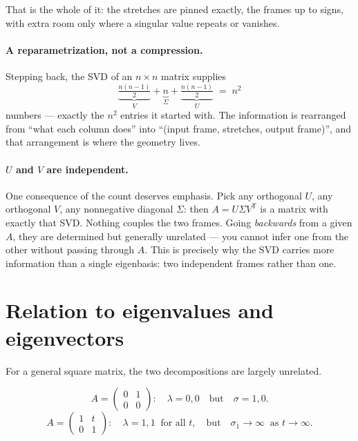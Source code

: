 \documentclass[11pt]{article}
\numberwithin{equation}{section}
\newcommand{\T}{^{\mathsf{T}}}
\theoremstyle{plainish}
\begin{document}
\noindent
That is the whole of it: the stretches are pinned exactly, the frames up to
signs, with extra room only where a singular value repeats or vanishes.

\paragraph{A reparametrization, not a compression.} Stepping back, the SVD of an
$n \times n$ matrix supplies
\begin{equation}\underbrace{\tfrac{n(n-1)}{2}}_{V} + \underbrace{n}_{\Sigma} + \underbrace{\tfrac{n(n-1)}{2}}_{U} \;=\; n^2
\end{equation}
numbers --- exactly the $n^2$ entries it started with. The information is
rearranged from ``what each column does'' into ``(input frame, stretches, output
frame)'', and that arrangement is where the geometry lives.

\paragraph{$U$ and $V$ are independent.} One consequence of the count deserves
emphasis. Pick any orthogonal $U$, any orthogonal $V$, any nonnegative diagonal
$\Sigma$: then $A = U\Sigma V\T$ is a matrix with exactly that SVD. Nothing
couples the two frames. Going \emph{backwards} from a given $A$, they are
determined but generally unrelated --- you cannot infer one from the other
without passing through $A$. This is precisely why the SVD carries more
information than a single eigenbasis: two independent frames rather than one.

\section{Relation to eigenvalues and eigenvectors}
\label{sec:eigen}

For a general square matrix, the two decompositions are largely unrelated.

\begin{equation}A = \begin{pmatrix} 0 & 1 \\ 0 & 0\end{pmatrix}:
\quad \lambda = 0, 0 \quad\text{but}\quad \sigma = 1, 0 .
\end{equation}
\begin{equation}A = \begin{pmatrix} 1 & t \\ 0 & 1\end{pmatrix}:
\quad \lambda = 1, 1 \ \text{ for all } t, \quad\text{but}\quad \sigma_1 \to \infty \ \text{ as } t \to \infty .
\end{equation}
\end{document}
